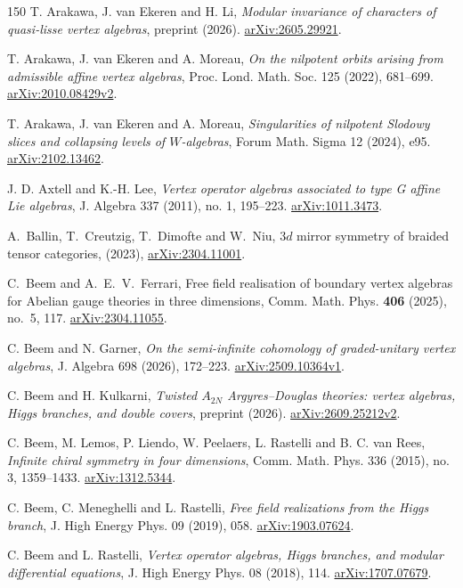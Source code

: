 \documentclass[11pt,a4paper]{amsart}
\numberwithin{equation}{section}
\theoremstyle{definition}
\theoremstyle{remark}
\newcommand{\arxiv}[1]{\href{https://arxiv.org/abs/#1}{arXiv:#1}}
\begin{document}
\begin{thebibliography}{150}
 T. Arakawa, J. van Ekeren and H. Li,
\emph{Modular invariance of characters of quasi-lisse vertex algebras},
preprint (2026). \arxiv{2605.29921}.

 T. Arakawa, J. van Ekeren and A. Moreau,
\emph{On the nilpotent orbits arising from admissible affine vertex algebras},
Proc. Lond. Math. Soc. 125 (2022), 681--699. \arxiv{2010.08429v2}.

 T. Arakawa, J. van Ekeren and A. Moreau,
\emph{Singularities of nilpotent Slodowy slices and collapsing levels of $W$-algebras},
Forum Math. Sigma 12 (2024), e95. \arxiv{2102.13462}.

 J. D. Axtell and K.-H. Lee,
\emph{Vertex operator algebras associated to type G affine Lie algebras},
J. Algebra 337 (2011), no. 1, 195--223. \arxiv{1011.3473}.


A.~Ballin, T.~Creutzig, T.~Dimofte and W.~Niu,
$3d$ mirror symmetry of braided tensor categories, (2023),
\arxiv{2304.11001}.

C.~Beem and A.~E.~V.~Ferrari,
Free field realisation of boundary vertex algebras
for Abelian gauge theories in three dimensions,
Comm. Math. Phys. \textbf{406} (2025), no.~5, 117.
\arxiv{2304.11055}.


 C. Beem and N. Garner,
\emph{On the semi-infinite cohomology of graded-unitary vertex algebras},
J. Algebra 698 (2026), 172--223. \arxiv{2509.10364v1}.

 C. Beem and H. Kulkarni,
\emph{Twisted $A_{2N}$ Argyres--Douglas theories: vertex algebras, Higgs branches, and double covers},
preprint (2026). \arxiv{2609.25212v2}.

 C. Beem, M. Lemos, P. Liendo, W. Peelaers, L. Rastelli and B. C. van Rees,
\emph{Infinite chiral symmetry in four dimensions},
Comm. Math. Phys. 336 (2015), no. 3, 1359--1433. \arxiv{1312.5344}.

 C. Beem, C. Meneghelli and L. Rastelli,
\emph{Free field realizations from the Higgs branch},
J. High Energy Phys. 09 (2019), 058. \arxiv{1903.07624}.

 C. Beem and L. Rastelli,
\emph{Vertex operator algebras, Higgs branches, and modular differential equations},
J. High Energy Phys. 08 (2018), 114. \arxiv{1707.07679}.






\end{thebibliography}
\end{document}
